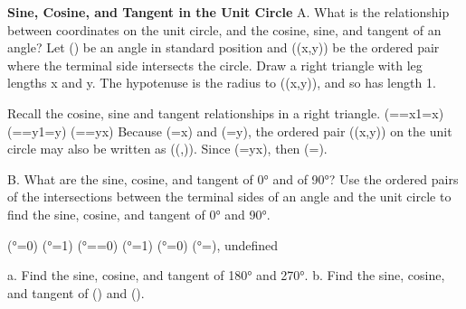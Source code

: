\documentclass{article}
\newenvironment{example}[1]{}{}         %
\newenvironment{tryit}[1]{}{}           %
\newcommand{\answer}[1]{}               %
\newcommand{\placeholder}[2]{}          %
\newcommand{\te}[1]{}                   %
\begin{document}
\begin{example}{5}
\textbf{Sine, Cosine, and Tangent in the Unit Circle}
A. What is the relationship between coordinates on the unit circle, and the cosine, sine, and tangent of an angle?
Let (\theta) be an angle in standard position and ((x,y)) be the ordered pair where the terminal side intersects the circle. Draw a right triangle with leg lengths x and y. The hypotenuse is the radius to ((x,y)), and so has length 1.
\placeholder{graph}{Black unit circle on arrowed x,y axes, red cardinal points with blue coordinates(1,0),(0,1),(-1,0),(0,-1). Red right triangle in I has horizontal leg x on positive x-axis, vertical leg y to circle, hypotenuse1 from origin, angle theta at origin. Terminal vertex labeled(x,y)=(cos theta,sin theta). No other ticks.}
Recall the cosine, sine and tangent relationships in a right triangle.
(\cos\theta==\frac x1=x)
(\sin\theta==\frac y1=y)
(\tan\theta==\frac yx)
Because (\cos\theta=x) and (\sin\theta=y), the ordered pair ((x,y)) on the unit circle may also be written as ((\cos\theta,\sin\theta)). Since (\tan\theta=\frac yx), then (\tan\theta=\frac{\sin\theta}{\cos\theta}).
\answer{(\cos\theta=x), (\sin\theta=y), (\tan\theta=\frac yx=\frac{\sin\theta}{\cos\theta}).}
B. What are the sine, cosine, and tangent of 0° and of 90°?
Use the ordered pairs of the intersections between the terminal sides of an angle and the unit circle to find the sine, cosine, and tangent of 0° and 90°.
\placeholder{graph}{Black unit circle centered at black origin on arrowed x,y axes, red cardinal points with blue labels(1,0),(0,1),(-1,0),(0,-1), black degree labels0°,90°,180°,270°. Red radius1 in I to(x,y), red angle theta from positive x. Callout: The ordered pair(x,y) is equivalent to(cos theta,sin theta). No ticks.}
(°=0)
(°=1)
(°==0)
(°=1)
(°=0)
(°=), undefined
\answer{0°: sine 0, cosine 1, tangent 0; 90°: sine 1, cosine 0, tangent undefined.}
\te{CONCEPTUAL UNDERSTANDING.}
\end{example}
\begin{tryit}{5}
a. Find the sine, cosine, and tangent of 180° and 270°.
b. Find the sine, cosine, and tangent of (\frac{}) and (\pi).
\answer{a. (\sin180°=0), (\cos180°=-1), (\tan180°=0); (\sin270°=-1), (\cos270°=0), (\tan270°) is undefined. b. (\sin\frac\pi2=1), (\cos\frac\pi2=0), (\tan\frac\pi2) is undefined; (\sin\pi=0), (\cos\pi=-1), (\tan\pi=0).}
\end{tryit}
\end{document}

